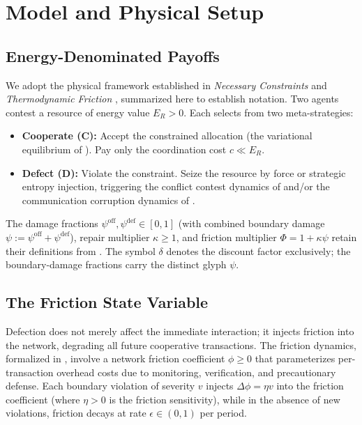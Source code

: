 \documentclass[11pt]{article}
\theoremstyle{plain}
\theoremstyle{definition}
\theoremstyle{remark}
\let\origsection\section
\renewcommand{\section}{\needspace{12\baselineskip}\origsection}
\let\origsubsection\subsection
\renewcommand{\subsection}{\needspace{7\baselineskip}\origsubsection}
\providecommand{\tightlist}{%
  \setlength{\itemsep}{0pt}\setlength{\parskip}{0pt}}
\begin{document}
\section{Model and Physical Setup}\label{model-and-physical-setup}

\subsection{Energy-Denominated
Payoffs}\label{energy-denominated-payoffs}

We adopt the physical framework established in \emph{Necessary
Constraints} \citep{TC-I} and \emph{Thermodynamic Friction}
\citep{TC-IV}, summarized here to establish notation. Two agents contest
a resource of energy value \(E_R > 0\). Each selects from two
meta-strategies:

\begin{itemize}
\tightlist
\item
  \textbf{Cooperate (C):} Accept the constrained allocation (the
  variational equilibrium of \citep{TC-I}). Pay only the coordination
  cost \(c \ll E_R\).
\item
  \textbf{Defect (D):} Violate the constraint. Seize the resource by
  force or strategic entropy injection, triggering the conflict contest
  dynamics of \citep{TC-IV} and/or the communication corruption dynamics
  of \citep{TC-II}.
\end{itemize}

The damage fractions \(\psi^{\text{off}}, \psi^{\text{def}} \in [0,1]\)
(with combined boundary damage
\(\psi := \psi^{\text{off}} + \psi^{\text{def}}\)), repair multiplier
\(\kappa \geq 1\), and friction multiplier \(\Phi = 1 + \kappa\psi\)
retain their definitions from \citep{TC-IV}. The symbol \(\delta\)
denotes the discount factor exclusively; the boundary-damage fractions
carry the distinct glyph \(\psi\).

\subsection{The Friction State
Variable}\label{the-friction-state-variable}

Defection does not merely affect the immediate interaction; it injects
friction into the network, degrading all future cooperative
transactions. The friction dynamics, formalized in \citep{TC-IV},
involve a network friction coefficient \(\phi \geq 0\) that
parameterizes per-transaction overhead costs due to monitoring,
verification, and precautionary defense. Each boundary violation of
severity \(v\) injects \(\Delta\phi = \eta v\) into the friction
coefficient (where \(\eta > 0\) is the friction sensitivity), while in
the absence of new violations, friction decays at rate
\(\epsilon \in (0,1)\) per period.
\end{document}
